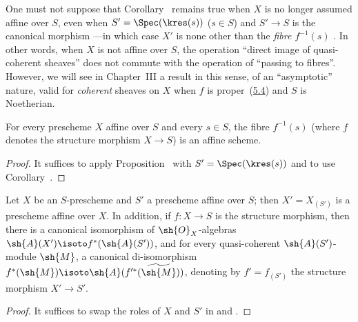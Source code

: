 \begin{remark}[1.5.3]
\label{II.1.5.3}
One must not suppose that Corollary~ remains true when $X$ is no longer assumed affine over $S$, even when $S'=\Spec(\kres(s))$ ($s\in S$) and $S'\to S$ is the canonical morphism ---in which case $X'$ is none other than the \emph{fibre $f^{-1}(s)$} .
In other words, when $X$ is not affine over $S$, the operation
``direct image of quasi-coherent sheaves'' does not commute with the operation of ``passing to fibres''.
However, we will see in Chapter~III  a result in this sense, of an ``asymptotic'' nature, valid for \emph{coherent} sheaves on $X$ when $f$ is proper~(\hyperref[subsection:II.5.4]{5.4}) and $S$ is Noetherian.
\end{remark}

\begin{corollary}[1.5.4]
\label{II.1.5.4}
For every prescheme $X$ affine over $S$ and every $s\in S$, the fibre $f^{-1}(s)$ (where $f$ denotes the structure morphism $X\to S$) is an affine scheme.
\end{corollary}

\begin{proof}
It suffices to apply Proposition~ with $S'=\Spec(\kres(s))$ and to use Corollary~.
\end{proof}

\begin{corollary}[1.5.5]
\label{II.1.5.5}
Let $X$ be an $S$-prescheme and $S'$ a prescheme affine over $S$; then $X'=X_{(S')}$ is a prescheme affine over $X$.
In addition, if $f:X\to S$ is the structure morphism, then there is a canonical isomorphism of $\sh{O}_X$-algebras $\sh{A}(X')\isoto f^*(\sh{A}(S'))$, and for every quasi-coherent $\sh{A}(S')$-module $\sh{M}$, a canonical di-isomorphism $f^*(\sh{M})\isoto\sh{A}(f^{\prime*}(\widetilde{\sh{M}}))$, denoting by $f'=f_{(S')}$ the structure morphism $X'\to S'$.
\end{corollary}

\begin{proof}
It suffices to swap the roles of $X$ and $S'$ in  and .
\end{proof}

